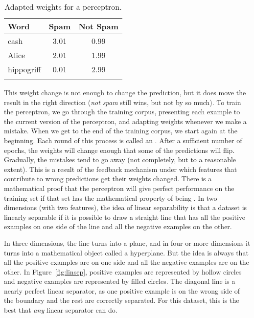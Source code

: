 \begin{table}
    \begin{tabular}{lcc}
    \lsptoprule
      Word & {Spam} & {Not Spam} \\\midrule
      cash & 3.01   & 0.99 \\
      Alice & 2.01 & 1.99 \\ 
      hippogriff & 0.01 & 2.99 \\
      \lspbottomrule
    \end{tabular}
    \caption{Adapted weights for a perceptron.}
    \label{per:weights2}
\end{table}

This weight change is not enough to change the prediction, but it does
move the result in the right direction (\emph{not spam} still wins, but not
by so much).  To train the perceptron, we go through the training
corpus, presenting each example to the current version of the
perceptron, and adapting weights whenever we make a mistake.  When we
get to the end of the training corpus, we start again at the
beginning. Each round of this process is called an
. After a sufficient number of epochs, the
weights will change enough that some of the predictions will flip.
Gradually, the mistakes tend to go away (not completely, but to a
reasonable extent). This is a result of the feedback mechanism under
which features that contribute to wrong predictions get their weights
changed.  There is a
mathematical proof that the perceptron will give perfect performance
on the training set if that set has the mathematical property of being
.  In two dimensions (with two features), the idea of linear
separability is that a dataset is linearly separable if it is possible
to draw a straight line that has all the positive examples on one side
of the line and all the negative examples on the other.

In three dimensions, the line turns into a plane, and in four or more
dimensions it turns into a mathematical object called a
hyperplane. But the idea is always that all the positive examples are
on one side and all the negative examples are on the other.  In
Figure~\ref{fig:linsep}, positive examples are represented by hollow circles
and negative examples are represented by filled circles.  The diagonal line
is a nearly perfect linear separator, as one positive example is on the
wrong side of the boundary and the rest are correctly separated. For this dataset, this is the best
that \emph{any} linear separator can do.

